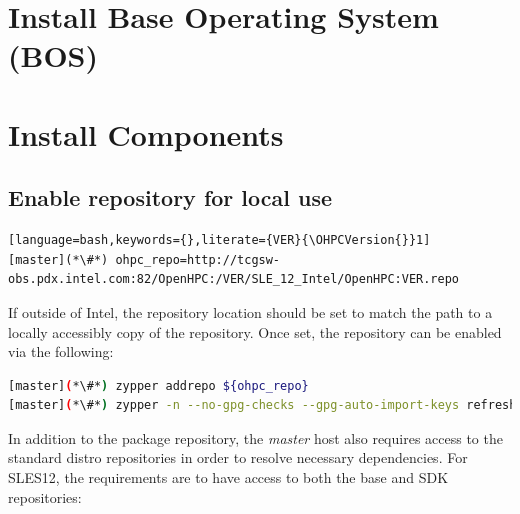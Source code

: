\documentclass[letterpaper]{article}
\newcommand{\baseOS}{SLES12}
\begin{document}






\section{Install Base Operating System (BOS)}



\section{Install \OHPC{} Components} \label{sec:basic_install}


\subsection{Enable \OHPC{} repository for local use} \label{sec:enable_repo}


\begin{lstlisting}[language=bash,keywords={},literate={VER}{\OHPCVersion{}}1]
[master](*\#*) ohpc_repo=http://tcgsw-obs.pdx.intel.com:82/OpenHPC:/VER/SLE_12_Intel/OpenHPC:VER.repo
\end{lstlisting}


If outside of Intel, the repository location should be set to match the path to
a locally accessibly copy of the \OHPC{} repository. Once set, the repository can be
enabled via the following: 

\begin{lstlisting}[language=bash,keywords={}]
[master](*\#*) zypper addrepo ${ohpc_repo}
[master](*\#*) zypper -n --no-gpg-checks --gpg-auto-import-keys refresh
\end{lstlisting}



In addition to the \OHPC{} package repository, the {\em master} host also
requires access to the standard distro repositories in order to resolve
necessary dependencies. For \baseOS{}, the requirements are to have access to
both the base and SDK repositories:
\end{document}
